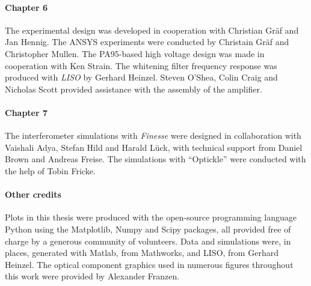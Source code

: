 \paragraph{Chapter 6}
The experimental design was developed in cooperation with Christian Gr\"{a}f and Jan Hennig. The ANSYS experiments were conducted by Christain Gr\"{a}f and Christopher Mullen. The PA95-based high voltage design was made in cooperation with Ken Strain. The whitening filter frequency response was produced with \emph{LISO} by Gerhard Heinzel. Steven O'Shea, Colin Craig and Nicholas Scott provided assistance with the assembly of the amplifier.

\paragraph{Chapter 7}
The interferometer simulations with \emph{Finesse} were designed in collaboration with Vaishali Adya, Stefan Hild and Harald L\"{u}ck, with technical support from Daniel Brown and Andreas Freise. The simulations with ``Optickle'' were conducted with the help of Tobin Fricke.

\paragraph{Other credits}
Plots in this thesis were produced with the open-source programming language Python using the Matplotlib, Numpy and Scipy packages, all provided free of charge by a generous community of volunteers. Data and simulations were, in places, generated with Matlab, from Mathworks, and LISO, from Gerhard Heinzel. The optical component graphics used in numerous figures throughout this work were provided by Alexander Franzen.